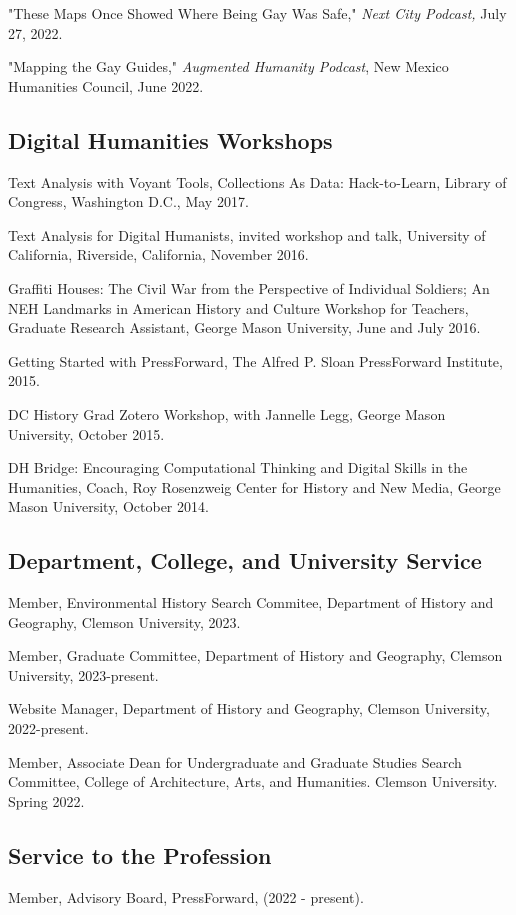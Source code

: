 \documentclass[11pt]{article}
\begin{document}
"These Maps Once Showed Where Being Gay Was Safe," \emph{Next City Podcast,} July 27, 2022.

"Mapping the Gay Guides," \emph{Augmented Humanity Podcast}, New Mexico Humanities Council, June 2022.

\subsection{Digital Humanities Workshops}
Text Analysis with Voyant Tools, Collections As Data: Hack-to-Learn, Library of Congress, Washington D.C., May 2017.

Text Analysis for Digital Humanists, invited workshop and talk, University of California, Riverside, California, November 2016.

Graffiti Houses: The Civil War from the Perspective of Individual Soldiers; An NEH Landmarks in American History and Culture Workshop for Teachers, Graduate Research Assistant, George Mason University, June and July 2016.

Getting Started with PressForward, The Alfred P. Sloan PressForward Institute, 2015.

DC History Grad Zotero Workshop, with Jannelle Legg, George Mason University, October 2015.

DH Bridge: Encouraging Computational Thinking and Digital Skills in the Humanities, Coach, Roy Rosenzweig Center for History and New Media, George Mason University, October 2014.

\subsection{Department, College, and University Service}\label{Department, College, and University Service}
Member, Environmental History Search Commitee, Department of History and Geography, Clemson University, 2023.

Member, Graduate Committee, Department of History and Geography, Clemson University, 2023-present.

Website Manager, Department of History and Geography, Clemson University, 2022-present.

Member, Associate Dean for Undergraduate and Graduate Studies Search Committee, College of Architecture, Arts, and Humanities. Clemson University. Spring 2022.

\subsection{Service to the Profession}\label{Other Professional and Community Service}
Member, Advisory Board, PressForward, (2022 - present).
\end{document}
